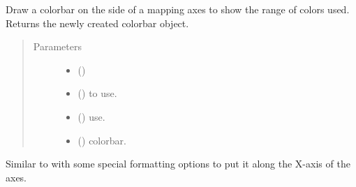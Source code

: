 \documentclass[letterpaper,10pt,english]{sphinxmanual}
\begin{document}
\begin{fulllineitems}
\label{\detokenize{xanespy:xanespy.plots.draw_colorbar}}
Draw a colorbar on the side of a mapping axes to show the range of
colors used. Returns the newly created colorbar object.
\begin{quote}\begin{description}
\item[{Parameters}] \leavevmode\begin{itemize}
\item {} 
 (\sphinxstyleliteralemphasis{-}) \textendash{} 

\item {} 
 (\sphinxstyleliteralemphasis{-}) \textendash{} to use.

\item {} 
 (\sphinxstyleliteralemphasis{-}) \textendash{} use.

\item {} 
 (\sphinxstyleliteralemphasis{-}) \textendash{} colorbar.

\end{itemize}

\end{description}\end{quote}

\end{fulllineitems}


\begin{fulllineitems}
\label{\detokenize{xanespy:xanespy.plots.draw_histogram_colorbar}}
Similar to  with some special formatting options
to put it along the X-axis of the axes.

\end{fulllineitems}

\end{document}

